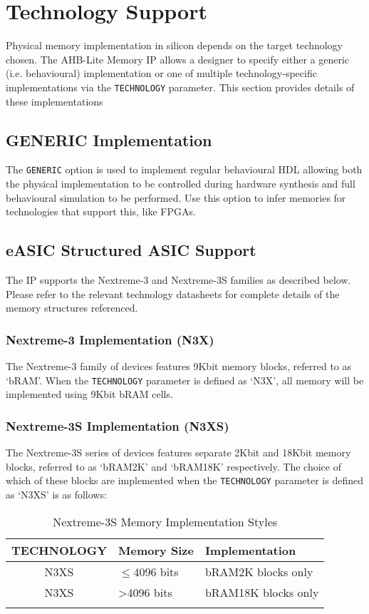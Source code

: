 \chapter{Technology Support} \label{technology-support}

Physical memory implementation in silicon depends on the target
technology chosen. The AHB-Lite Memory IP allows a designer to
specify either a generic (i.e. behavioural) implementation or one 
of multiple technology-specific implementations via the \texttt{TECHNOLOGY} 
parameter. This section provides details of these implementations

 \section{GENERIC Implementation} \label{generic-implementation}

The \texttt{GENERIC} option is used to implement regular behavioural HDL allowing
both the physical implementation to be controlled during hardware
synthesis and full behavioural simulation to be performed.
Use this option to infer memories for technologies that support this, like FPGAs.

 \section{eASIC Structured ASIC Support} \label{easic-structured-asic-support}

The IP supports the Nextreme-3 and Nextreme-3S families as described
below. Please refer to the relevant technology datasheets for complete
details of the memory structures referenced.

 \subsection{Nextreme-3 Implementation (N3X)} \label{nextreme-3-implementation-n3x}

The Nextreme-3 family of devices features 9Kbit memory blocks, referred
to as `bRAM'. When the \texttt{TECHNOLOGY} parameter is defined as `N3X', all
memory will be implemented using 9Kbit bRAM cells.

 \subsection{Nextreme-3S Implementation (N3XS)} \label{nextreme-3s-implementation-n3xs}

The Nextreme-3S series of devices features separate 2Kbit and 18Kbit
memory blocks, referred to as `bRAM2K' and `bRAM18K' respectively. The
choice of which of these blocks are implemented when the \texttt{TECHNOLOGY}
parameter is defined as `N3XS' is as follows:

\begin{longtable}[]{@{}cll@{}}
	\toprule
	TECHNOLOGY & Memory Size & Implementation\tabularnewline
	\midrule
	\endhead
	N3XS & $\leqslant$4096 bits & bRAM2K blocks only\tabularnewline
	N3XS & \textgreater{}4096 bits & bRAM18K blocks only\tabularnewline
	\bottomrule
	\caption{Nextreme-3S Memory Implementation Styles}
\end{longtable}
